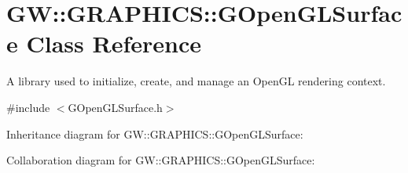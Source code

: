 \hypertarget{classGW_1_1GRAPHICS_1_1GOpenGLSurface}{}\section{GW\+::G\+R\+A\+P\+H\+I\+CS\+::G\+Open\+G\+L\+Surface Class Reference}
\label{classGW_1_1GRAPHICS_1_1GOpenGLSurface}


A library used to initialize, create, and manage an Open\+GL rendering context.  




{\ttfamily \#include $<$G\+Open\+G\+L\+Surface.\+h$>$}



Inheritance diagram for GW\+::G\+R\+A\+P\+H\+I\+CS\+::G\+Open\+G\+L\+Surface\+:


Collaboration diagram for GW\+::G\+R\+A\+P\+H\+I\+CS\+::G\+Open\+G\+L\+Surface\+:
